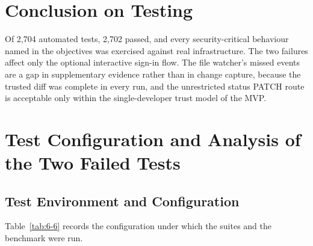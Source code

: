 \documentclass[12pt,a4paper,oneside]{report}
\begin{document}
\endgroup

\section{Conclusion on Testing}\label{conclusion-on-testing}

Of 2,704 automated tests, 2,702 passed, and every security-critical behaviour named in the objectives was exercised against real infrastructure. The two failures affect only the optional interactive sign-in flow. The file watcher's missed events are a gap in supplementary evidence rather than in change capture, because the trusted diff was complete in every run, and the unrestricted status PATCH route is acceptable only within the single-developer trust model of the MVP.

\clearpage
\section{Test Configuration and Analysis of the Two Failed Tests}\label{test-config-and-failures}

\subsection{Test Environment and Configuration}\label{test-configuration}

Table~\ref{tab:6-6} records the configuration under which the suites and the benchmark were run.
\end{document}
